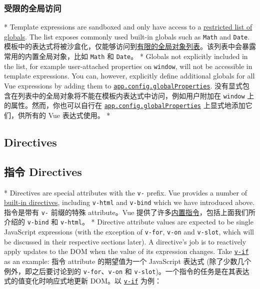 \begin{paracol}{2}
\subsubsection{受限的全局访问}
\switchcolumn[0]*%
Template expressions are sandboxed and only have access to a
\href{https://github.com/vuejs/core/blob/main/packages/shared/src/globalsAllowList.ts\#L3}{restricted
list of globals}. The list exposes commonly used built-in globals such
as \texttt{Math} and \texttt{Date}.
\switchcolumn
模板中的表达式将被沙盒化，仅能够访问到\href{https://github.com/vuejs/core/blob/main/packages/shared/src/globalsAllowList.ts\#L3}{有限的全局对象列表}。该列表中会暴露常用的内置全局对象，比如
\texttt{Math} 和 \texttt{Date}。
\switchcolumn[0]*%
Globals not explicitly included in the list, for example user-attached
properties on \texttt{window}, will not be accessible in template
expressions. You can, however, explicitly define additional globals for
all Vue expressions by adding them to
\href{https://vuejs.org/api/application.html\#app-config-globalproperties}{\texttt{app.config.globalProperties}}.
\switchcolumn
没有显式包含在列表中的全局对象将不能在模板内表达式中访问，例如用户附加在
\texttt{window} 上的属性。然而，你也可以自行在
\href{https://cn.vuejs.org/api/application.html\#app-config-globalproperties}{\texttt{app.config.globalProperties}}
上显式地添加它们，供所有的 Vue 表达式使用。
\switchcolumn[0]*%
\subsection{Directives}
\switchcolumn
\subsection{指令 Directives}
\switchcolumn[0]*%
Directives are special attributes with the \texttt{v-} prefix. Vue
provides a number of
\href{https://vuejs.org/api/built-in-directives.html}{built-in
directives}, including \texttt{v-html} and \texttt{v-bind} which we have
introduced above.
\switchcolumn
指令是带有 \texttt{v-} 前缀的特殊 attribute。Vue
提供了许多\href{https://cn.vuejs.org/api/built-in-directives.html}{内置指令}，包括上面我们所介绍的
\texttt{v-bind} 和 \texttt{v-html}。
\switchcolumn[0]*%
Directive attribute values are expected to be single JavaScript
expressions (with the exception of \texttt{v-for}, \texttt{v-on} and
\texttt{v-slot}, which will be discussed in their respective sections
later). A directive's job is to reactively apply updates to the DOM when
the value of its expression changes. Take
\href{https://vuejs.org/api/built-in-directives.html\#v-if}{\texttt{v-if}}
as an example:
\switchcolumn
指令 attribute 的期望值为一个 JavaScript 表达式
(除了少数几个例外，即之后要讨论到的 \texttt{v-for}、\texttt{v-on} 和
\texttt{v-slot})。一个指令的任务是在其表达式的值变化时响应式地更新
DOM。以
\href{https://cn.vuejs.org/api/built-in-directives.html\#v-if}{\texttt{v-if}}
为例：


\end{paracol}
